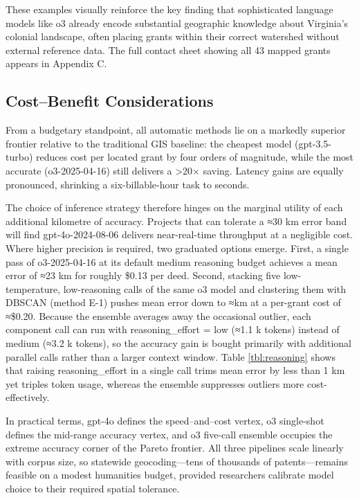 These examples visually reinforce the key finding that sophisticated
language models like o3 already encode substantial geographic knowledge
about Virginia's colonial landscape, often placing grants within their
correct watershed without external reference data. The full contact
sheet showing all 43 mapped grants appears in Appendix C.

\subsection{Cost--Benefit
Considerations}\label{costbenefit-considerations}

From a budgetary standpoint, all automatic methods lie on a markedly
superior frontier relative to the traditional GIS baseline: the cheapest
model (gpt-3.5-turbo) reduces cost per located grant by four orders of
magnitude, while the most accurate (o3-2025-04-16) still delivers a
\textgreater20× saving. Latency gains are equally pronounced, shrinking
a six-billable-hour task to seconds.

The choice of inference strategy therefore hinges on the marginal
utility of each additional kilometre of accuracy. Projects that can
tolerate a ≈30 km error band will find gpt-4o-2024-08-06 delivers
near-real-time throughput at a negligible cost. Where higher precision
is required, two graduated options emerge. First, a single pass of
o3-2025-04-16 at its default medium reasoning budget achieves a mean
error of ≈23 km for roughly \$0.13 per deed. Second, stacking five
low-temperature, low-reasoning calls of the same o3 model and clustering
them with DBSCAN (\DIFaddbegin {}\DIFaddend method E-1) pushes mean error down to
≈\DIFdelbegin {}\DIFdelend \DIFaddbegin {}\DIFaddend km at a per-grant cost of ≈\$0.20. Because the ensemble averages
away the occasional outlier, each component call can run with
reasoning\_effort = low (≈1.1 k tokens) instead of medium (≈3.2 k
tokens), so the accuracy gain is bought primarily with additional
parallel calls rather than a larger context window. Table
\ref{tbl:reasoning} shows that raising reasoning\_effort in a single
call trims mean error by less than 1 km yet triples token usage, whereas
the ensemble suppresses outliers more cost-effectively.

In practical terms, gpt-4o defines the speed--and--cost vertex, o3
single-shot defines the mid-range accuracy vertex, and o3 five-call
ensemble occupies the extreme accuracy corner of the Pareto frontier.
All three pipelines scale linearly with corpus size, so statewide
geocoding---tens of thousands of patents---remains feasible on a modest
humanities budget, provided researchers calibrate model choice to their
required spatial tolerance.

